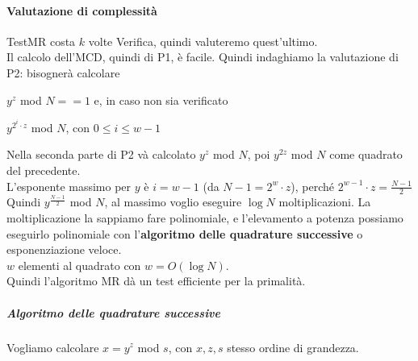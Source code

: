 \documentclass[10pt]{book}
\begin{document}
\paragraph{Valutazione di complessità} TestMR costa $k$ volte Verifica, quindi valuteremo quest'ultimo.\\
Il calcolo dell'MCD, quindi di P1, è facile. Quindi indaghiamo la valutazione di P2: bisognerà calcolare
\begin{list}{}{}
	\item $y^z$ mod $N == 1$ e, in caso non sia verificato
	\item $y^{2^i\cdot z}$ mod $N$, con $0 \leq i \leq w-1$
\end{list}
Nella seconda parte di P2 và calcolato $y^z$ mod $N$, poi $y^{2z}$ mod $N$ come quadrato del precedente.\\
L'esponente massimo per $y$ è $i = w-1$ (da $N-1 = 2^w \cdot z$), perché $2^{w-1}\cdot z = \frac{N-1}{2}$\\
Quindi $y^{\frac{N-1}{2}}$ mod $N$, al massimo voglio eseguire $\log N$ moltiplicazioni. La moltiplicazione la sappiamo fare polinomiale, e l'elevamento a potenza possiamo eseguirlo polinomiale con l'\textbf{algoritmo delle quadrature successive} o esponenziazione veloce.\\
$w$ elementi al quadrato con $w = O(\log N)$.\\
Quindi l'algoritmo MR dà un test efficiente per la primalità.
\subparagraph{Algoritmo delle quadrature successive} Vogliamo calcolare $x = y^z$ mod $s$, con $x,z,s$ stesso ordine di grandezza.
\end{document}
